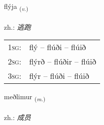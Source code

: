 \documentclass[frontgrid, backgrid]{flacards}\usepackage[]{graphicx}\usepackage[]{xcolor}
\begin{document}
\renewcommand{\flhead}{\vskip5pt \fboxsep=0pt {\small\bfseries\footnotesize Sagnorð | 动词}}
\renewcommand{\fcfoot}{\vskip5pt \fboxsep=0pt \hspace{2pt}{\small\bfseries\footnotesize 3K}}

\renewcommand{\blhead}{\vskip5pt {\small\bfseries\footnotesize Sagnorð | 动词 }}
\renewcommand{\bcfoot}{\vskip5pt \hspace{2pt}{\small\bfseries\footnotesize 3K}}


{flýja \small{\textsubscript{(\textit{v.})}} \\[1ex] %
\textphonetic{[fliːja]} \\
zh.: \emph{逃跑} \\  [2ex]
\renewcommand*{\arraystretch}{0.8}
\begin{tabular}{p{1cm}l}
\textsc{1sg}: & flý -- flúði -- flúið \\ 
\textsc{2sg}: & flýrð -- flúðir -- flúið \\ 
\textsc{3sg}: & flýr -- flúði -- flúið \\ 
\end{tabular}
}

\renewcommand{\flhead}{\vskip5pt \fboxsep=0pt {\small\bfseries\footnotesize Nafnorð | 名词}}
\renewcommand{\fcfoot}{\vskip5pt \fboxsep=0pt \hspace{2pt}{\small\bfseries\footnotesize 3K}}

\renewcommand{\blhead}{\vskip5pt {\small\bfseries\footnotesize Nafnorð | 名词 }}
\renewcommand{\bcfoot}{\vskip5pt \hspace{2pt}{\small\bfseries\footnotesize 3K}}


{meðlimur \small{\textsubscript{(\textit{m.})}} \\[1ex] %
\textphonetic{[mɛðlɪmʏr]} \\
zh.: \emph{成员} \\  [2ex]
\renewcommand*{\arraystretch}{0.8}
}
\end{document}
